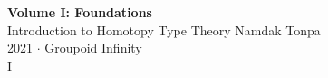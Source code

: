 \documentclass{article}
\begin{document}
\begin{titlepage}
    \centering
    \vspace*{1in}
    \Huge
    \textbf{Volume I: Foundations} \\
    \vspace{0.5in}
    \LARGE
    Introduction to Homotopy Type Theory
    \vfill
    \large
    Namdak Tonpa \\
    \vspace{0.1in}
    \Large
    2021 $\cdot$ Groupoid Infinity \\
    \vspace{0.5in}
    I
\end{titlepage}

\tableofcontents
\newif\ifincludeTOC
\includeTOCfalse

\newpage
\begin{standalone}
    
\end{standalone}
\newpage
\begin{standalone}
    
\end{standalone}
\newpage
\begin{standalone}
    
\end{standalone}
\newpage
\begin{standalone}
    
\end{standalone}
\end{document}

